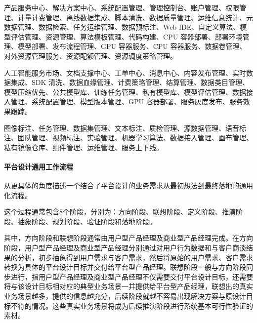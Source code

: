 \documentclass[letterpaper,10pt,english]{sphinxmanual}
\begin{document}

产品服务中心、解决方案中心、系统配置管理、管理控制台、账户管理、权限管理、计量计费管理、离线数据集成、脚本清洗、数据质量管理、运维信息统计、元数据管理、数据检索、任务运维管理、数据预标注、Web
IDE、自定义算法、模型评估管理、资源管理、算法模板管理、代码构建、CPU
容器部署、部署环境管理、模型部署、发布流程管理、GPU 容器服务、CPU
容器服务、数据卷管理、对外资源管理服务、资源配额管理、资源调度策略管理。


人工智能服务市场、文档支撑中心、工单中心、消息中心、内容发布管理、实时数据集成、SDK
清洗、数据血缘管理、计费策略管理、结算管理、数据类目管理、模型压缩优先、公共模型库、训练任务管理、私有模型库、模型评估管理、数据接入管理、系统配置管理、模型版本管理、GPU
容器部署、服务灰度发布、服务效果跟踪。


图像标注、任务管理、数据集管理、文本标注、质检管理、源数据管理、语音标注、团队管理、视频标注、实验管理、机器学习算法、数据接入管理、画布管理、私有镜像仓库、组件管理、运维管理、服务上下线。


\paragraph{平台设计通用工作流程}
\label{\detokenize{chapter_introduction/platform:id8}}
从更具体的角度描述一个结合了平台设计的业务需求从最初想法到最终落地的通用化流程。
%
\begin{footnote}[135]\sphinxAtStartFootnote
{}
%
\end{footnote}

这个过程通常包含8个阶段，分别为：方向阶段、联想阶段、定义阶段、推演阶段、抽象阶段、规划阶段、验证阶段和落地阶段。

其中，方向阶段和联想阶段通常由用户型产品经理及商业型产品经理完成。在方向阶段，用户型产品经理及商业型产品经理分别通过对用户行为数据和与客户商谈结果的分析，初步抽象得到用户需求与客户需求，然后将原始的用户需求、客户需求转换为具体的平台设计目标并交付给平台型产品经理。联想阶段一般与方向阶段同步进行，指用户型产品经理及商业型产品经理不仅需要交付平台设计目标，还需要将与该设计目标相对应的典型业务场景一并提供给平台型产品经理，联想出的真实业务场景越多，提供的信息越充分，后续阶段就越不容易出现解决方案与原设计目标不符的情况。这些真实业务场景将成为后续推演阶段进行系统基本可行性验证的素材。
\end{document}
